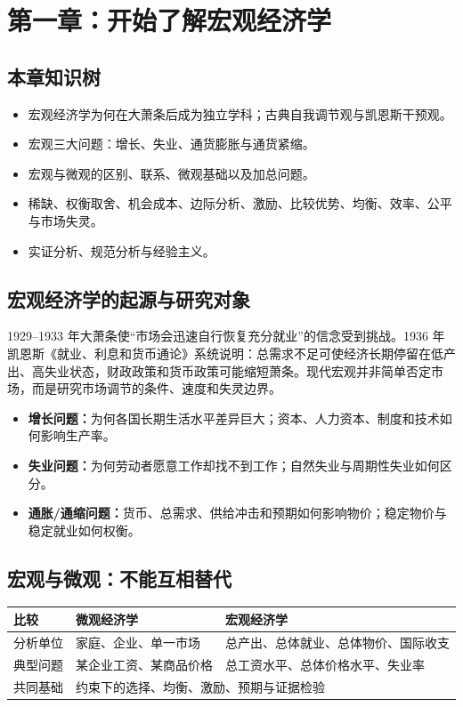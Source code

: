 \documentclass[UTF8,11pt,a4paper]{ctexart}
\newcommand{\term}[1]{\textbf{#1}}
\begin{document}
\section{第一章：开始了解宏观经济学}

\subsection{本章知识树}
\begin{itemize}
  \item 宏观经济学为何在大萧条后成为独立学科；古典自我调节观与凯恩斯干预观。
  \item 宏观三大问题：增长、失业、通货膨胀与通货紧缩。
  \item 宏观与微观的区别、联系、微观基础以及加总问题。
  \item 稀缺、权衡取舍、机会成本、边际分析、激励、比较优势、均衡、效率、公平与市场失灵。
  \item 实证分析、规范分析与经验主义。
\end{itemize}

\subsection{宏观经济学的起源与研究对象}
\begin{keybox}[历史逻辑]
1929--1933 年大萧条使“市场会迅速自行恢复充分就业”的信念受到挑战。1936 年凯恩斯《就业、利息和货币通论》系统说明：总需求不足可使经济长期停留在低产出、高失业状态，财政政策和货币政策可能缩短萧条。现代宏观并非简单否定市场，而是研究市场调节的条件、速度和失灵边界。
\end{keybox}

\begin{itemize}
  \item \term{增长问题：}为何各国长期生活水平差异巨大；资本、人力资本、制度和技术如何影响生产率。
  \item \term{失业问题：}为何劳动者愿意工作却找不到工作；自然失业与周期性失业如何区分。
  \item \term{通胀/通缩问题：}货币、总需求、供给冲击和预期如何影响物价；稳定物价与稳定就业如何权衡。
\end{itemize}

\subsection{宏观与微观：不能互相替代}
\begin{longtable}{p{}p{}p{}}
\toprule
比较 & 微观经济学 & 宏观经济学\\
\midrule
分析单位 & 家庭、企业、单一市场 & 总产出、总体就业、总体物价、国际收支\\
典型问题 & 某企业工资、某商品价格 & 总工资水平、总体价格水平、失业率\\
共同基础 & \multicolumn{2}{l}{约束下的选择、均衡、激励、预期与证据检验}\\
\bottomrule
\end{longtable}
\end{document}
